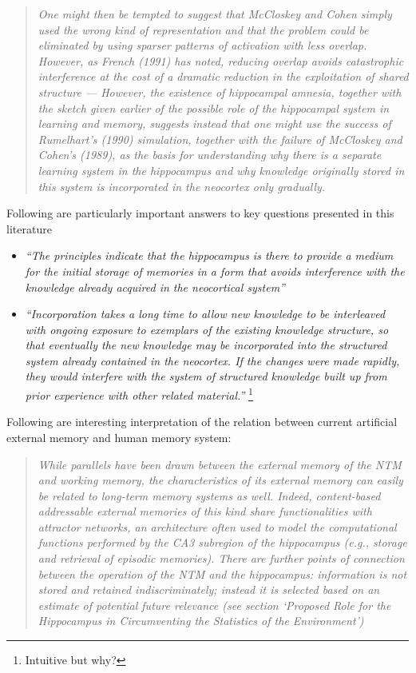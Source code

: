 \documentclass[12pt]{article}
\begin{document}
\begin{quote}
    \textit{One might then be tempted
    to suggest that McCloskey and Cohen simply used the wrong
    kind of representation and that the problem could be eliminated by using sparser patterns of activation with less overlap.
    However, as French (1991) has noted, reducing overlap avoids
    catastrophic interference at the cost of a dramatic reduction in
    the exploitation of shared structure --- However, the existence of hippocampal amnesia, together
    with the sketch given earlier of the possible role of the hippocampal system in learning and memory, suggests instead that
    one might use the success of Rumelhart's (1990) simulation,
    together with the failure of McCloskey and Cohen's (1989), as
    the basis for understanding why there is a separate learning system in the hippocampus and why knowledge originally stored
    in this system is incorporated in the neocortex only gradually.} \cite{Mcclelland95}    
\end{quote}

Following are particularly important answers to key questions presented in this literature
\begin{itemize}
    \item \textit{``The principles indicate that the hippocampus is there to provide a medium for the initial storage of memories in a form that
    avoids interference with the knowledge already acquired in the
    neocortical system''}
    \item \textit{``Incorporation takes a long time to allow new knowledge to be
    interleaved with ongoing exposure to exemplars of the existing
    knowledge structure, so that eventually the new knowledge may
    be incorporated into the structured system already contained
    in the neocortex. If the changes were made rapidly, they would
    interfere with the system of structured knowledge built up from
    prior experience with other related material.''} \footnote{Intuitive but why?}
\end{itemize}

Following are interesting interpretation of the relation between current artificial external memory 
and human memory system:
\begin{quote}
    \textit{While parallels have been drawn between the external memory of the NTM and working memory, the characteristics
    of its external memory can easily be related to long-term memory systems as well. Indeed, content-based addressable
    external memories of this kind share functionalities with attractor networks, an architecture often used to model the
    computational functions performed by the CA3 subregion of the hippocampus (e.g., storage and retrieval of episodic
    memories). There are further points of connection between the operation of the NTM and the hippocampus:
    information is not stored and retained indiscriminately; instead it is selected based on an estimate of potential future
    relevance (see section ‘Proposed Role for the Hippocampus in Circumventing the Statistics of the Environment’)} \cite{Kumaran16} 
\end{quote}
\end{document}
